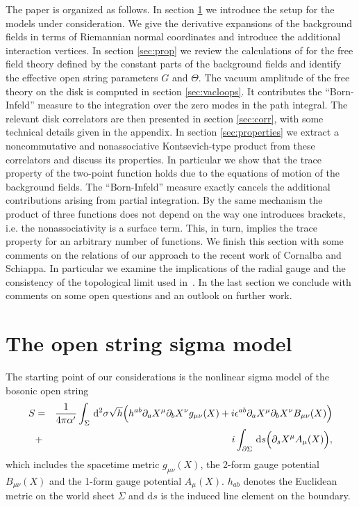 \documentclass[a4paper,12pt]{article}
\newcommand {\ud} {\mathrm{d}}
\begin{document}
The paper is organized as follows.
In section \ref{sec:model} we introduce the setup for the models
under consideration. We give the derivative expansions of 
the background fields in terms of Riemannian normal coordinates and 
introduce the additional interaction vertices. In section \ref{sec:prop} 
we review the calculations of \cite{Schomerus:1999ug} for the free field 
theory defined by the constant parts of the background 
fields and identify the effective open string parameters $G$ and $\Theta$. 
The vacuum amplitude of the free theory on the disk is computed in section 
\ref{sec:vacloops}. It contributes the ``Born-Infeld'' measure to the 
integration over the zero modes in the path integral. 
The relevant disk correlators are then presented in section \ref{sec:corr},
with some technical details given in the appendix. 
In section \ref{sec:properties} we extract 
a noncommutative and nonassociative Kontsevich-type product from these
correlators and discuss its properties. 
In particular we show that the trace property of the two-point function 
holds due to the equations of motion of the background fields. 
The ``Born-Infeld'' measure exactly cancels the additional contributions 
arising from partial integration. By the same mechanism the product of 
three functions does not depend on the way one introduces brackets, i.e. 
the nonassociativity is a surface term. This, in turn, implies the trace 
property for an arbitrary number of functions. We finish this section with 
some comments on the relations of our approach to the recent work of 
Cornalba and Schiappa. In particular we examine the implications of the 
radial gauge and the consistency of the topological limit used 
in~\cite{Cornalba:2001sm}. In the last section we
conclude with comments on some open questions and an outlook on further work.

\section{The open string sigma model}
\label{sec:model}

The starting point of our considerations is the nonlinear sigma model of 
the bosonic open string\cite{Fradkin:1985qd,Abouelsaood:1987gd,Callan:1987bc}
\begin{eqnarray}
  \label{eq:sigmamodel}
  S &=& \frac 1{4\pi\alpha'} \int _\Sigma \,\ud^2\sigma \sqrt{h}
        {\Bigl(
         h^{ab} \partial_aX^\mu \partial_bX^\nu g_{\mu\nu}(X)
            +i \epsilon^{ab} \partial_aX^\mu \partial_bX^\nu B_{\mu\nu}(X)
         \Bigr)}\nonumber\\
    &+&  i \int _{\partial\Sigma} \,\ud s
         {\Bigl(
          \partial_s X^\mu A_\mu(X)
         \Bigr)},
\end{eqnarray}
which includes the spacetime metric $g_{\mu\nu}(X)$, the 2-form
gauge potential $B_{\mu\nu}(X)$ and the 1-form gauge potential $A_\mu(X)$.
$h_{ab}$ denotes the Euclidean metric on the world sheet $\Sigma$ and
$\ud s$ is the induced line element on the boundary.
\end{document}
